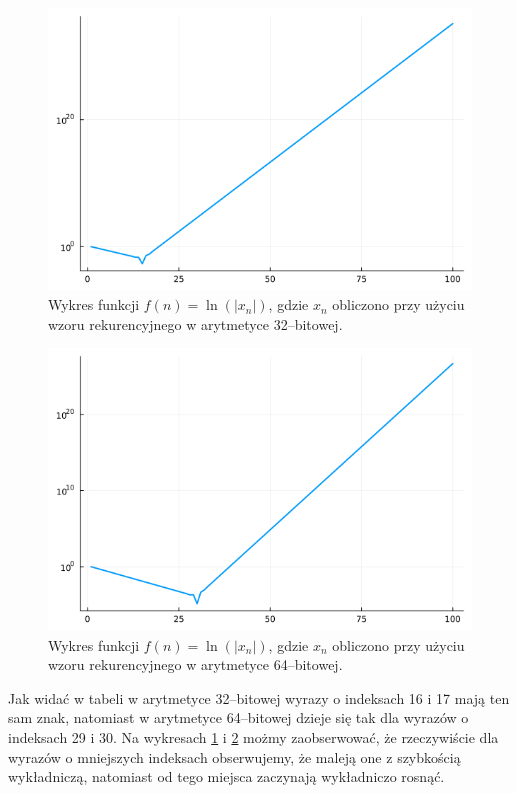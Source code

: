 \documentclass{article}
\begin{document}
\begin{figure}[!h]
    \centering
    \includegraphics[scale=0.4]{plot32_log_1.png}
    \caption{Wykres funkcji \(f(n) = \ln(|x_n|)\), gdzie \(x_n\) obliczono przy użyciu wzoru rekurencyjnego w arytmetyce 32--bitowej.}
    \label{fig:plot32_log_1}
\end{figure}

\begin{figure}[!h]
    \centering
    \includegraphics[scale=0.4]{plot64_log_1.png}
    \caption{Wykres funkcji \(f(n) = \ln(|x_n|)\), gdzie \(x_n\) obliczono przy użyciu wzoru rekurencyjnego w arytmetyce 64--bitowej.}
    \label{fig:plot64_log_1}
\end{figure}


Jak widać w tabeli w arytmetyce 32--bitowej wyrazy o indeksach 16 i 17 mają ten sam znak, natomiast w arytmetyce 64--bitowej dzieje się tak dla wyrazów o indeksach 29 i 30. Na wykresach \ref{fig:plot32_log_1} i \ref{fig:plot64_log_1} możmy zaobserwować, że rzeczywiście dla wyrazów o mniejszych indeksach obserwujemy, że maleją one z szybkością wykładniczą, natomiast od tego miejsca zaczynają wykładniczo rosnąć.  
\end{document}
